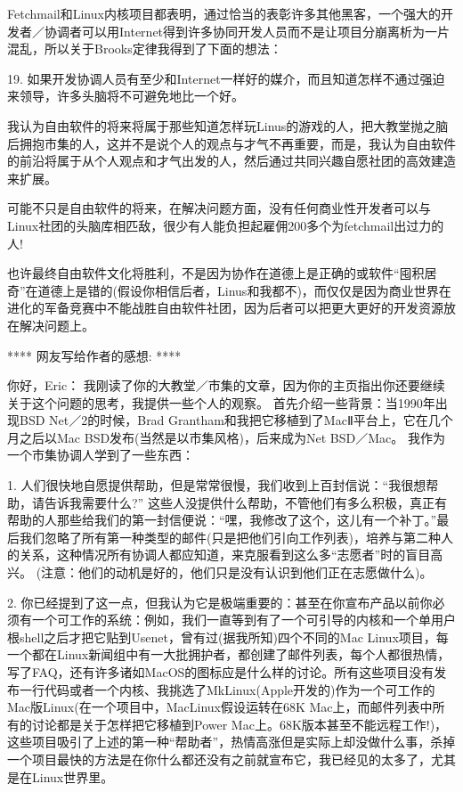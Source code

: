 \documentclass[a4paper,12pt,UTF8,twoside]{ctexbook}
\begin{document}
Fetchmail和Linux内核项目都表明，通过恰当的表彰许多其他黑客，一个强大的开发者／协调者可以用Internet得到许多协同开发人员而不是让项目分崩离析为一片混乱，所以关于Brooks定律我得到了下面的想法：


19. 如果开发协调人员有至少和Internet一样好的媒介，而且知道怎样不通过强迫来领导，许多头脑将不可避免地比一个好。


我认为自由软件的将来将属于那些知道怎样玩Linus的游戏的人，把大教堂抛之脑后拥抱市集的人，这并不是说个人的观点与才气不再重要，而是，我认为自由软件的前沿将属于从个人观点和才气出发的人，然后通过共同兴趣自愿社团的高效建造来扩展。


可能不只是自由软件的将来，在解决问题方面，没有任何商业性开发者可以与Linux社团的头脑库相匹敌，很少有人能负担起雇佣200多个为fetchmail出过力的人!


也许最终自由软件文化将胜利，不是因为协作在道德上是正确的或软件“囤积居奇”在道德上是错的(假设你相信后者，Linus和我都不)，而仅仅是因为商业世界在进化的军备竞赛中不能战胜自由软件社团，因为后者可以把更大更好的开发资源放在解决问题上。

**** 网友写给作者的感想: ****

你好，Eric：
我刚读了你的大教堂／市集的文章，因为你的主页指出你还要继续关于这个问题的思考，我提供一些个人的观察。 首先介绍一些背景：当1990年出现BSD Net／2的时候，Brad Grantham和我把它移植到了MacⅡ平台上，它在几个月之后以Mac BSD发布(当然是以市集风格)，后来成为Net BSD／Mac。 我作为一个市集协调人学到了一些东西：


1. 人们很快地自愿提供帮助，但是常常很慢，我们收到上百封信说：“我很想帮助，请告诉我需要什么?” 这些人没提供什么帮助，不管他们有多么积极，真正有帮助的人那些给我们的第一封信便说：“嘿，我修改了这个，这儿有一个补丁。”最后我们忽略了所有第一种类型的邮件(只是把他们引向工作列表)，培养与第二种人的关系，这种情况所有协调人都应知道，来克服看到这么多“志愿者”时的盲目高兴。
(注意：他们的动机是好的，他们只是没有认识到他们正在志愿做什么)。


2. 你已经提到了这一点，但我认为它是极端重要的：甚至在你宣布产品以前你必须有一个可工作的系统：例如，我们一直等到有了一个可引导的内核和一个单用户根shell之后才把它贴到Usenet，曾有过(据我所知)四个不同的Mac Linux项目，每一个都在Linux新闻组中有一大批拥护者，都创建了邮件列表，每个人都很热情，写了FAQ，还有许多诸如MacOS的图标应是什么样的讨论。所有这些项目没有发布一行代码或者一个内核、我挑选了MkLinux(Apple开发的)作为一个可工作的Mac版Linux(在一个项目中，MacLinux假设运转在68K Mac上，而邮件列表中所有的讨论都是关于怎样把它移植到Power Mac上。68K版本甚至不能远程工作!)，这些项目吸引了上述的第一种“帮助者”，热情高涨但是实际上却没做什么事，杀掉一个项目最快的方法是在你什么都还没有之前就宣布它，我已经见的太多了，尤其是在Linux世界里。
\end{document}

